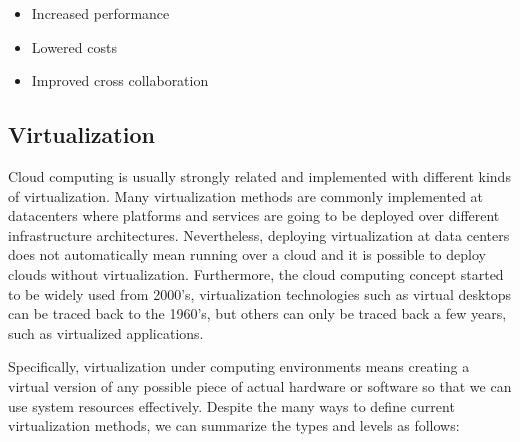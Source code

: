\begin{itemize}
\item Increased performance
\item Lowered costs
\item Improved cross collaboration
\end{itemize}



\subsection{Virtualization}\label{SOA:Virtualization}

Cloud computing is usually strongly related and implemented with different kinds of virtualization. Many virtualization methods are commonly implemented at datacenters where platforms and services are going to be deployed over different infrastructure architectures. Nevertheless, deploying virtualization at data centers does not automatically mean running over a cloud and it is possible to deploy clouds without virtualization. Furthermore, the cloud computing concept started to be widely used from 2000's, virtualization  technologies such as virtual desktops can be traced back to the 1960’s, but others can only be traced back a few years, such as virtualized applications.

Specifically, virtualization under computing environments means creating a virtual version of any possible piece of actual hardware or software so that we can use system resources effectively. Despite the many ways to define current virtualization methods, we can summarize the types and levels as follows:

